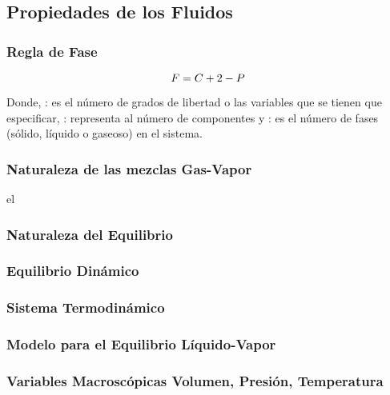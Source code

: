 \subsection{Propiedades de los Fluidos}


\subsubsection{Regla de Fase}
    \begin{equation}
    \label{eq:thermo:phase_rule}
       F = C + 2 - P
    \end{equation}

    Donde,\newline 
    \freeDegree : es el número de grados de libertad o las variables que se tienen que especificar, \newline 
    \componentNumber : representa al número de componentes y \newline
    \phaseNumber : es el número de fases (sólido, líquido o gaseoso) en el sistema.

  \figCoordinatePV

\subsubsection{Naturaleza de las mezclas Gas-Vapor}
el
\subsubsection{Naturaleza del Equilibrio}

\subsubsection{Equilibrio Dinámico}
\subsubsection{Sistema Termodinámico}

\subsubsection*{Modelo para el Equilibrio Líquido-Vapor}
\subsubsection*{Variables Macroscópicas Volumen, Presión, Temperatura}

